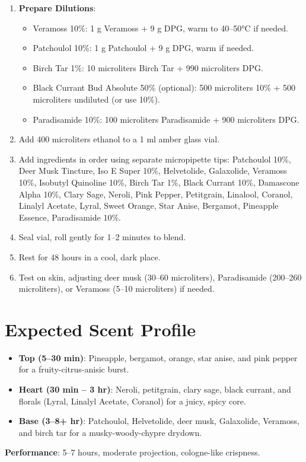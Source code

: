 \documentclass{article}
\begin{document}
\begin{enumerate}
    \item \textbf{Prepare Dilutions}:
    \begin{itemize}
        \item Veramoss 10\%: 1 g Veramoss + 9 g DPG, warm to 40--50°C if needed.
        \item Patchoulol 10\%: 1 g Patchoulol + 9 g DPG, warm if needed.
        \item Birch Tar 1\%: 10 microliters Birch Tar + 990 microliters DPG.
        \item Black Currant Bud Absolute 50\% (optional): 500 microliters 10\% + 500 microliters undiluted (or use 10\%).
        \item Paradisamide 10\%: 100 microliters Paradisamide + 900 microliters DPG.
    \end{itemize}
    
    \item Add 400 microliters ethanol to a 1 ml amber glass vial.
    
    \item Add ingredients in order using separate micropipette tips: Patchoulol 10\%, Deer Musk Tincture, Iso E Super 10\%, Helvetolide, Galaxolide, Veramoss 10\%, Isobutyl Quinoline 10\%, Birch Tar 1\%, Black Currant 10\%, Damascone Alpha 10\%, Clary Sage, Neroli, Pink Pepper, Petitgrain, Linalool, Coranol, Linalyl Acetate, Lyral, Sweet Orange, Star Anise, Bergamot, Pineapple Essence, Paradisamide 10\%.
    
    \item Seal vial, roll gently for 1--2 minutes to blend.
    
    \item Rest for 48 hours in a cool, dark place.
    
    \item Test on skin, adjusting deer musk (30--60 microliters), Paradisamide (200--260 microliters), or Veramoss (5--10 microliters) if needed.
\end{enumerate}

\section{Expected Scent Profile}

\begin{itemize}
    \item \textbf{Top (5--30 min)}: Pineapple, bergamot, orange, star anise, and pink pepper for a fruity-citrus-anisic burst.
    
    \item \textbf{Heart (30 min -- 3 hr)}: Neroli, petitgrain, clary sage, black currant, and florals (Lyral, Linalyl Acetate, Coranol) for a juicy, spicy core.
    
    \item \textbf{Base (3--8+ hr)}: Patchoulol, Helvetolide, deer musk, Galaxolide, Veramoss, and birch tar for a musky-woody-chypre drydown.
\end{itemize}

\textbf{Performance}: 5--7 hours, moderate projection, cologne-like crispness.
\end{document}
